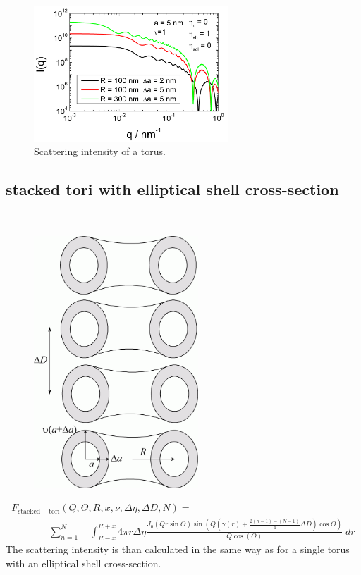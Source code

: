 \begin{figure}[htb]
\begin{center}
\includegraphics[width=0.65\textwidth,height=0.5\textwidth]{../images/form_factor/cylindrical_obj/Torus.png}
\end{center}
\caption{Scattering intensity of a torus. }
\label{fig:Torus}
\end{figure}



\newpage
\subsection{stacked tori with elliptical shell cross-section} ~\\
\begin{figure}[htb]
\begin{center}
\includegraphics[width=0.55\textwidth,height=0.8\textwidth]{stacked_torus.png}
\end{center}
\caption{} \label{stackedTori}
\end{figure}
\begin{align}
F_\text{stacked} & _\text{tori}(Q,\Theta,R,x,\nu,\Delta\eta,\Delta D,N)  =  \\
& \sum_{n=1}^N \quad \int_{R-x}^{R+x} 4\pi r \Delta\eta
\frac{J_0(Qr\sin\Theta) \sin(
Q(\gamma(r)+\frac{2(n-1)-(N-1)}{4}\Delta
D)\cos\Theta)}{Q\cos(\Theta)} \; dr \nonumber
\end{align}
The scattering intensity is than calculated in the same way as for
a single torus with an elliptical shell cross-section.

